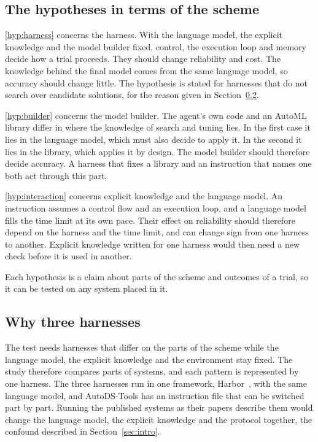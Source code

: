 \subsection{The hypotheses in terms of the scheme}
\label{sec:hyp-scheme}

\ref{hyp:harness} concerns the harness. With the language model,
the explicit knowledge and the model builder fixed, control, the execution
loop and memory decide how a trial proceeds. They should change reliability
and cost. The knowledge behind the final model comes from the same language
model, so accuracy should change little. The hypothesis is stated for harnesses that do not
search over candidate solutions, for the reason given in
Section~\ref{sec:why-three}.

\ref{hyp:builder} concerns the model builder. The agent's own
code and an AutoML library differ in where the knowledge of search and
tuning lies. In the first case it lies in the language model, which must
also decide to apply it. In the second it lies in the library, which applies
it by design. The model builder should therefore decide accuracy. A
harness that fixes a library and an instruction that names one both act
through this part.

\ref{hyp:interaction} concerns explicit knowledge and the language model.
An instruction assumes a control flow and an execution loop, and a language
model fills the time limit at its own pace. Their effect on reliability
should therefore depend on the harness and the time limit, and can change
sign from one harness to another. Explicit knowledge written for one harness
would then need a new check before it is used in another.

Each hypothesis is a claim about parts of the scheme and outcomes of a
trial, so it can be tested on any system placed in it.

\subsection{Why three harnesses}
\label{sec:why-three}

The test needs harnesses that differ on the parts of the scheme while the
language model, the explicit knowledge and the environment stay fixed. The study
therefore compares parts of systems, and each pattern is represented by one
harness. The three harnesses run in one framework,
Harbor~\citep{harbor2026}, with the same language model, and AutoDS-Tools
has an instruction file that can be switched part by part. Running the
published systems as their papers describe them would change the language
model, the explicit knowledge and the protocol together, the confound described in
Section~\ref{sec:intro}.

